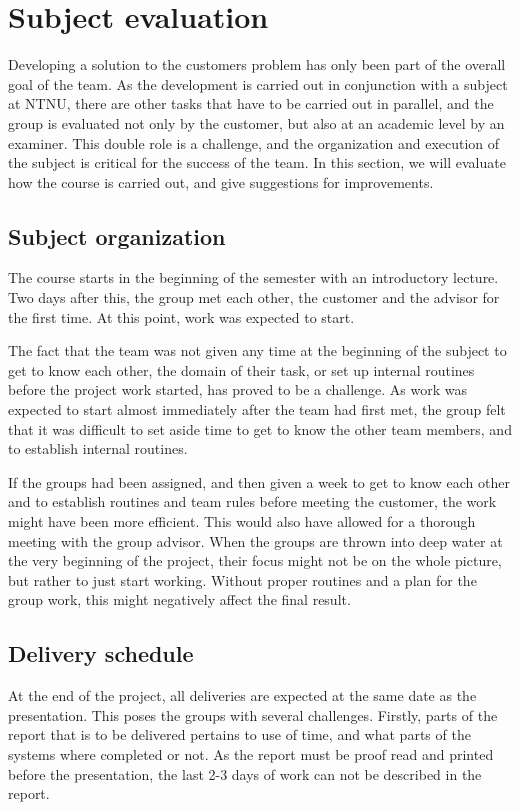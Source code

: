 \documentclass[11pt,a4paper,titlepage,oneside]{report}
\begin{document}
\newpage
\section{Subject evaluation}
\label{sec:SubjectEvaluation}
Developing a solution to the customers problem has only been part of the overall goal of the team. As the development is carried out in conjunction with a subject at \gls{NTNU}, there are other tasks that have to be carried out in parallel, and the group is evaluated not only by the customer, but also at an academic level by an examiner. This double role is a challenge, and the organization and execution of the subject is critical for the success of the team. In this section, we will evaluate how the course is carried out, and give suggestions for improvements. 

\subsection{Subject organization}
The course starts in the beginning of the semester with an introductory lecture. Two days after this, the group met each other, the customer and the advisor for the first time. At this point, work was expected to start. 

The fact that the team was not given any time at the beginning of the subject to get to know each other, the domain of their task, or set up internal routines before the project work started, has proved to be a challenge. As work was expected to start almost immediately after the team had first met, the group felt that it was difficult to set aside time to get to know the other team members, and to establish internal routines. 

If the groups had been assigned, and then given a week to get to know each other and to establish routines and team rules before meeting the customer, the work might have been more efficient. This would also have allowed for a thorough meeting with the group advisor. When the groups are thrown into deep water at the very beginning of the project, their focus might not be on the whole picture, but rather to just start working. Without proper routines and a plan for the group work, this might negatively affect the final result.

\subsection{Delivery schedule}
At the end of the project, all deliveries are expected at the same date as the presentation. This poses the groups with several challenges. Firstly, parts of the report that is to be delivered pertains to use of time, and what parts of the systems where completed or not. As the report must be proof read and printed before the presentation, the last 2-3 days of work can not be described in the report. 
\end{document}
